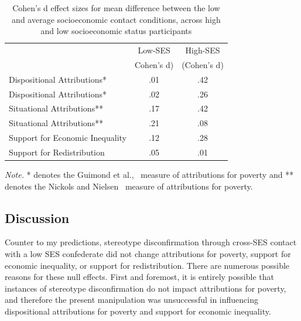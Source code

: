 \documentclass{sfuthesis}
\begin{document}
\begin{table}[h]
  \begin{center}
    \caption{Cohen’s d effect sizes for mean difference between the low and average socioeconomic contact conditions, across high and low socioeconomic status participants}
    \label{tab:seventh}
    \begin{tabular}{l c c}
    \hline
      & \multicolumn{1}{c}{Low-SES} & \multicolumn{1}{c}{High-SES}\\\cmidrule{2-3}
      & \multicolumn{1}{c}{Cohen's d)} & \multicolumn{1}{c}{(Cohen's d)}\\
      \hline
      Dispositional Attributions* & \multicolumn{1}{c}{.01} & \multicolumn{1}{c}{.42}\\
      Dispositional Attributions* & \multicolumn{1}{c}{.02} & \multicolumn{1}{c}{.26}\\
      Situational Attributions** & \multicolumn{1}{c}{.17} & \multicolumn{1}{c}{.42}\\
      Situational Attributions** & \multicolumn{1}{c}{.21} & \multicolumn{1}{c}{.08}\\
      Support for Economic Inequality & \multicolumn{1}{c}{.12} & \multicolumn{1}{c}{.28}\\
      Support for Redistribution & \multicolumn{1}{c}{.05} & \multicolumn{1}{c}{.01}\\
      \hline
    \end{tabular}
  \end{center}
  \textit{Note.} * denotes the Guimond et al.,~\cite{guimond89} measure of attributions for poverty and ** denotes the Nickols and Nielsen~\cite{nickols11} measure of attributions for poverty.
\end{table}

\subsection{Discussion}

Counter to my predictions, stereotype disconfirmation through cross-SES contact with a low SES confederate did not change attributions for poverty, support for economic inequality, or support for redistribution. There are numerous possible reasons for these null effects. First and foremost, it is entirely possible that instances of stereotype disconfirmation do not impact attributions for poverty, and therefore the present manipulation was unsuccessful in influencing dispositional attributions for poverty and support for economic inequality.
\end{document}
